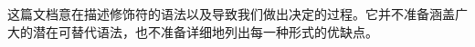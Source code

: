 \documentclass[../main.tex]{subfiles}
\begin{document}
这篇文档意在描述修饰符的语法以及导致我们做出决定的过程。它并不准备涵盖广大的潜在可替代语法，也不准备详细地列出每一种形式的优缺点。
\end{document}
